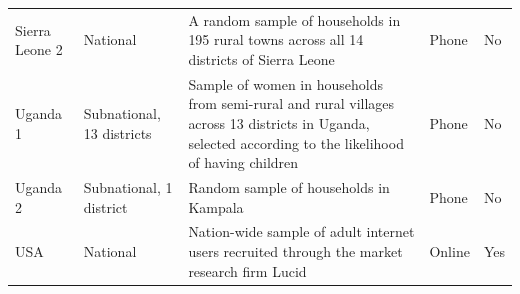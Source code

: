\documentclass[
  12pt,
]{article}
\begin{document}
\begin{landscape}
\begin{table}[!h]
{\begin{tabular}[t]{>{\raggedright\arraybackslash}p{8em}>{\raggedright\arraybackslash}p{12em}>{\raggedright\arraybackslash}p{30em}ll}
Sierra Leone 2 & National & A random sample of households in 195 rural towns across all 14 districts of Sierra Leone & Phone & No\\
Uganda 1 & Subnational, 13 districts & Sample of women in households from semi-rural and rural villages across 13 districts in Uganda, selected according to the likelihood of having children & Phone & No\\
Uganda 2 & Subnational, 1 district & Random sample of households in Kampala & Phone & No\\
USA & National & Nation-wide sample of adult internet users recruited through the market research firm Lucid & Online & Yes\\
\bottomrule
\end{tabular}}
\end{table}
\end{landscape}
\end{document}
